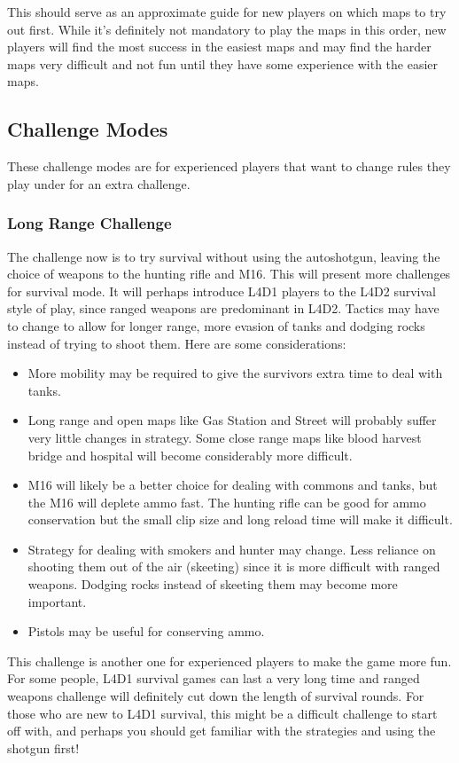 This should serve as an approximate guide for new players on which maps to try out first. While it's definitely not mandatory to play the maps in this order, new players will find the most success in the easiest maps and may find the harder maps very difficult and not fun until they have some experience with the easier maps.

\subsection{Challenge Modes}
These challenge modes are for experienced players that want to change rules they play under for an extra challenge.
\subsubsection{Long Range Challenge}
The challenge now is to try survival without using the autoshotgun, leaving the choice of weapons to the hunting rifle and M16. This will present more challenges for survival mode. It will perhaps introduce L4D1 players to the L4D2 survival style of play, since ranged weapons are predominant in L4D2. Tactics may have to change to allow for longer range, more evasion of tanks and dodging rocks instead of trying to shoot them. Here are some considerations:
\begin{itemize}
\item More mobility may be required to give the survivors extra time to deal with tanks.
\item Long range and open maps like Gas Station and Street will probably suffer very little changes in strategy. Some close range maps like blood harvest bridge and hospital will become considerably more difficult.
\item M16 will likely be a better choice for dealing with commons and tanks, but the M16 will deplete ammo fast. The hunting rifle can be good for ammo conservation but the small clip size and long reload time will make it difficult.
\item Strategy for dealing with smokers and hunter may change. Less reliance on shooting them out of the air (skeeting) since it is more difficult with ranged weapons. Dodging rocks instead of skeeting them may become more important.
\item Pistols may be useful for conserving ammo.
\end{itemize}

This challenge is another one for experienced players to make the game more fun. For some people, L4D1 survival games can last a very long time and ranged weapons challenge will definitely cut down the length of survival rounds. For those who are new to L4D1 survival, this might be a difficult challenge to start off with, and perhaps you should get familiar with the strategies and using the shotgun first!

